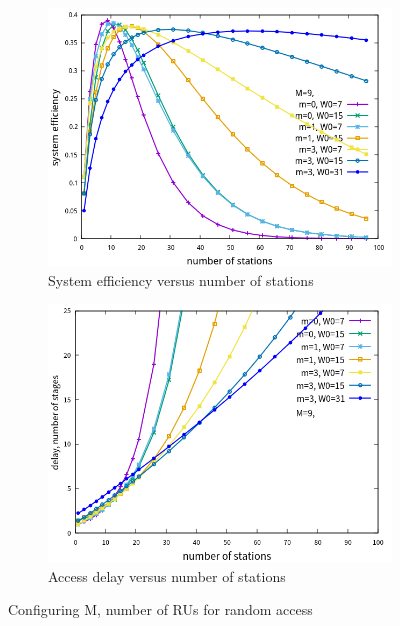 \begin{figure}[!h]
\centering
\begin{subfigure}{\textwidth}  
  \centering  
  \includegraphics[scale=0.64]{./figure/n_eff_perf.png}  
    \caption{System efficiency versus number of stations}   
    \label{fig_n_eff}
\end{subfigure}   

\begin{subfigure}{\textwidth}
\includegraphics[scale=.64]{./figure/n_delay_perf.png}
\caption{Access delay versus number of stations}
\label{fig_n_delay}
\end{subfigure}
\caption{Configuring M, number of RUs for random access}
\end{figure}



